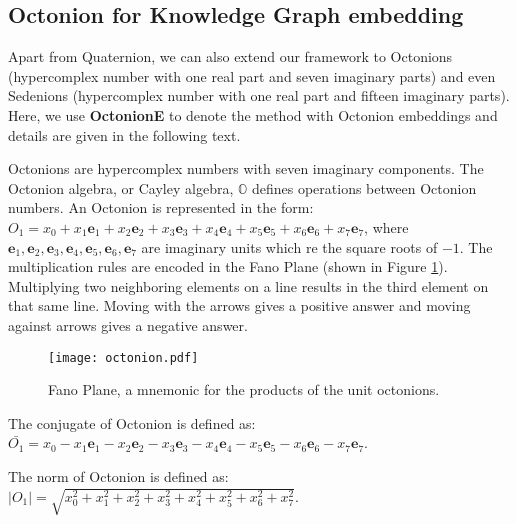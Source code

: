 \documentclass{article}
\begin{document}
\subsection{Octonion for Knowledge Graph embedding}
Apart from Quaternion, we can also extend our framework to Octonions (hypercomplex number with one real part and seven imaginary parts) and even Sedenions (hypercomplex number with one real part and fifteen imaginary parts). Here, we use \textbf{OctonionE} to denote the method with Octonion embeddings and details are given in the following text.

Octonions are hypercomplex numbers with seven imaginary components. The Octonion algebra, or Cayley algebra, $\mathbb{O}$ defines operations between Octonion numbers. An Octonion is represented in the form: $O_1 = x_0 + x_1 \textbf{e}_1 + x_2 \textbf{e}_2 + x_3 \textbf{e}_3 + x_4 \textbf{e}_4 + x_5 \textbf{e}_5 + x_6 \textbf{e}_6 + x_7 \textbf{e}_7$, where $\textbf{e}_1, \textbf{e}_2, \textbf{e}_3, \textbf{e}_4, \textbf{e}_5, \textbf{e}_6, \textbf{e}_7$ are imaginary units which re the square roots of $-1$. The multiplication rules are encoded in the Fano Plane (shown in Figure \ref{fig:octonion}). Multiplying two neighboring elements on a line results in the third element on that same line. Moving with the arrows gives a positive answer and moving against arrows gives a negative answer.

\begin{figure}[t]
\centering
\texttt{[image: octonion.pdf]}
\caption{Fano Plane, a mnemonic for the products of the unit octonions.}
\label{fig:octonion}
\vspace{-1.em}
\end{figure}

The conjugate of Octonion is defined as: $\bar{O_1} =  x_0 - x_1 \textbf{e}_1 - x_2 \textbf{e}_2 - x_3 \textbf{e}_3 - x_4 \textbf{e}_4 - x_5 \textbf{e}_5 - x_6 \textbf{e}_6 - x_7 \textbf{e}_7$.

The norm of Octonion is defined as: $|O_1| =  \sqrt{x_0^2 + x_1^2 + x_2^2 + x_3^2 + x_4^2 + x_5^2 + x_6^2 + x_7^2}$.
\end{document}

